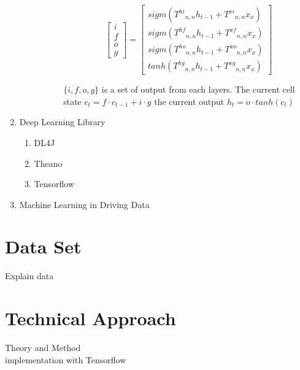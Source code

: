 \documentclass[12pt]{article}
\begin{document}
\begin{enumerate}
\begin{enumerate}
\begin{enumerate}
\begin{enumerate}
\[
\begin{bmatrix}
    i \\
    f \\
    o \\
    g
\end{bmatrix}
=
\begin{bmatrix}
    sigm({T^{hi}}_{n,n}h_{t-1} + {T^{xi}}_{n,n}x_{x}) \\
    sigm({T^{hf}}_{n,n}h_{t-1} + {T^{xf}}_{n,n}x_{x}) \\
    sigm({T^{ho}}_{n,n}h_{t-1} + {T^{xo}}_{n,n}x_{x}) \\
    tanh({T^{hg}}_{n,n}h_{t-1} + {T^{xg}}_{n,n}x_{x})
\end{bmatrix}
\]

$\{i, f, o, g\}$ is a set of output from each layers.
The current cell state $c_t = f \cdot c_{t-1} + i \cdot g$
the current output $h_t = o \cdot tanh(c_t)$
			
				
			\end{enumerate}
		\end{enumerate}
	\end{enumerate}

\item Deep Learning Library\\
	\begin{enumerate}
	\item DL4J\\
	\item Theano\\
	\item Tensorflow\\
	\end{enumerate}

\item Machine Learning in Driving Data\\
\end{enumerate}


\section{Data Set}
Explain data\\


\section{Technical Approach}
Theory and Method\\
implementation with Tensorflow\\
\end{document}
